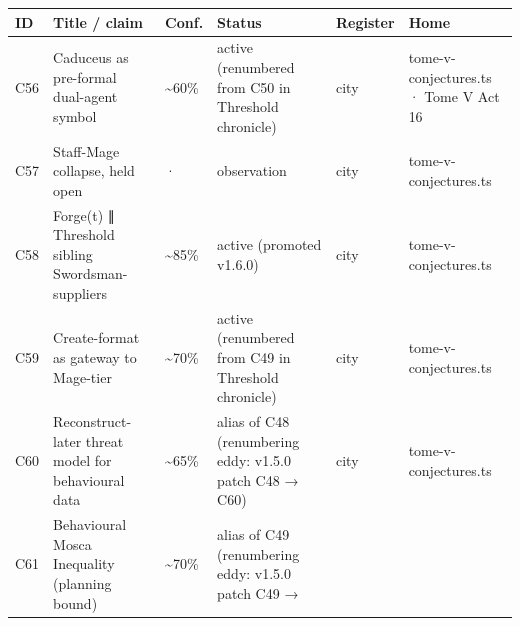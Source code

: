 \documentclass[
  11pt,
]{article}
\newcounter{none} %
\begin{document}
{\def\LTcaptype{none} %
\begin{longtable}[]{@{}
  >{\raggedright\arraybackslash}p{}
  >{\raggedright\arraybackslash}p{}
  >{\raggedright\arraybackslash}p{}
  >{\raggedright\arraybackslash}p{}
  >{\raggedright\arraybackslash}p{}
  >{\raggedright\arraybackslash}p{}@{}}
\toprule\noalign{}
\begin{minipage}[b]{\linewidth}\raggedright
ID
\end{minipage} & \begin{minipage}[b]{\linewidth}\raggedright
Title / claim
\end{minipage} & \begin{minipage}[b]{\linewidth}\raggedright
Conf.
\end{minipage} & \begin{minipage}[b]{\linewidth}\raggedright
Status
\end{minipage} & \begin{minipage}[b]{\linewidth}\raggedright
Register
\end{minipage} & \begin{minipage}[b]{\linewidth}\raggedright
Home
\end{minipage} \\
\midrule\noalign{}
\endhead
\bottomrule\noalign{}
\endlastfoot
C56 & Caduceus as pre-formal dual-agent symbol & \textasciitilde60\% &
active (renumbered from C50 in Threshold chronicle) & city &
tome-v-conjectures.ts · Tome V Act 16 \\
C57 & Staff-Mage collapse, held open & · & observation & city &
tome-v-conjectures.ts \\
C58 & Forge(t) ∥ Threshold sibling Swordsman-suppliers &
\textasciitilde85\% & active (promoted v1.6.0) & city &
tome-v-conjectures.ts \\
C59 & Create-format as gateway to Mage-tier & \textasciitilde70\% &
active (renumbered from C49 in Threshold chronicle) & city &
tome-v-conjectures.ts \\
C60 & Reconstruct-later threat model for behavioural data &
\textasciitilde65\% & alias of C48 (renumbering eddy: v1.5.0 patch C48 →
C60) & city & tome-v-conjectures.ts \\
C61 & Behavioural Mosca Inequality (planning bound) &
\textasciitilde70\% & alias of C49 (renumbering eddy: v1.5.0 patch C49 →

\end{longtable}}
\end{document}
